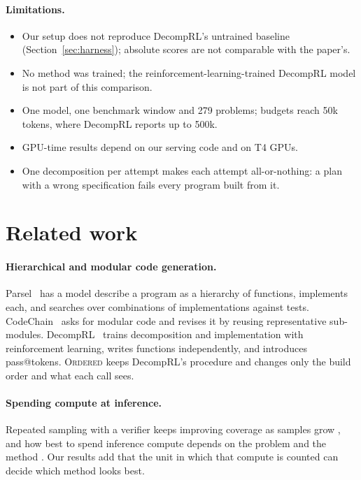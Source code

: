 \documentclass[11pt]{article}
\newcommand{\ordered}{\textsc{Ordered}}
\begin{document}
\paragraph{Limitations.}
\begin{itemize}
  \item Our setup does not reproduce DecompRL's untrained baseline (Section~\ref{sec:harness}); absolute scores are not
        comparable with the paper's.
  \item No method was trained; the reinforcement-learning-trained DecompRL model is not part of this comparison.
  \item One model, one benchmark window and 279 problems; budgets reach 50k tokens, where DecompRL reports up to 500k.
  \item GPU-time results depend on our serving code and on T4 GPUs.
  \item One decomposition per attempt makes each attempt all-or-nothing: a plan with a wrong specification fails every
        program built from it.
\end{itemize}

\section{Related work}
\label{sec:related}

\paragraph{Hierarchical and modular code generation.} Parsel~\citep{zelikman2023parsel} has a model describe a program
as a hierarchy of functions, implements each, and searches over combinations of implementations against tests.
CodeChain~\citep{le2024codechain} asks for modular code and revises it by reusing representative sub-modules.
DecompRL~\citep{decugis2026decomprl} trains decomposition and implementation with reinforcement learning, writes
functions independently, and introduces pass@tokens. \ordered{} keeps DecompRL's procedure and changes only the build
order and what each call sees.

\paragraph{Spending compute at inference.} Repeated sampling with a verifier keeps improving coverage as samples grow
\citep{brown2024monkeys}, and how best to spend inference compute depends on the problem and the method
\citep{snell2024scaling}. Our results add that the unit in which that compute is counted can decide which method looks
best.
\end{document}
